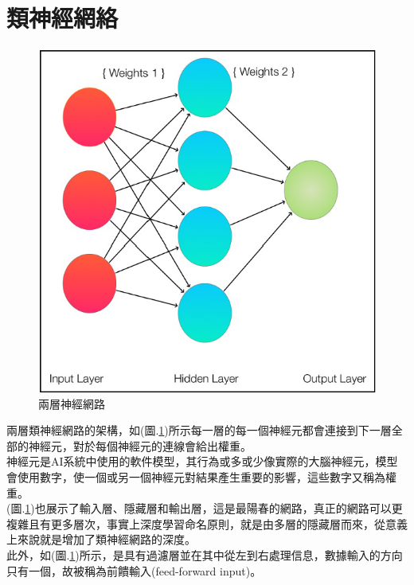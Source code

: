 \documentclass[14pt,a4paper]{report}  %
\begin{document}
\section{類神經網絡}
\begin{figure}[hbt!]
\begin{center}
\includegraphics[scale=0.74]{兩層神經網路}
\caption{\Large 兩層神經網路}\label{兩層神經網路}
\end{center}
\end{figure}

 兩層類神經網路的架構，如(圖.\ref{兩層神經網路})所示每一層的每一個神經元都會連接到下一層全部的神經元，對於每個神經元的連線會給出權重。\\

 神經元是AI系統中使用的軟件模型，其行為或多或少像實際的大腦神經元，模型會使用數字，使一個或另一個神經元對結果產生重要的影響，這些數字又稱為權重。\\

 (圖.\ref{兩層神經網路})也展示了輸入層、隱藏層和輸出層，這是最陽春的網路，真正的網路可以更複雜且有更多層次，事實上深度學習命名原則，就是由多層的隱藏層而來，從意義上來說就是增加了類神經網路的深度。\\

 此外，如(圖.\ref{兩層神經網路})所示，是具有過濾層並在​​其中從左到右處理信息，數據輸入的方向只有一個，故被稱為前饋輸入(feed-forward input)。\\
\end{document}

